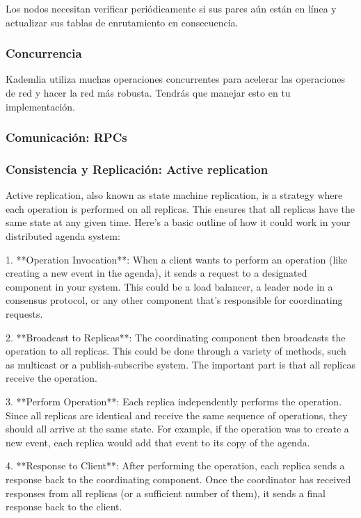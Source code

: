 \documentclass[10pt]{article} %
\begin{document}
	Los nodos necesitan verificar periódicamente si sus pares aún están en línea y actualizar sus tablas de enrutamiento en consecuencia.
	
	\subsubsection{Concurrencia} 
	
	Kademlia utiliza muchas operaciones concurrentes para acelerar las operaciones de red y hacer la red más robusta. Tendrás que manejar esto en tu implementación.
	
	\subsubsection{Comunicaci\'on: RPCs}
	
	\subsubsection{Consistencia y Replicaci\'on: Active replication}
	
	Active replication, also known as state machine replication, is a strategy where each operation is performed on all replicas. This ensures that all replicas have the same state at any given time. Here's a basic outline of how it could work in your distributed agenda system:
	
	1. **Operation Invocation**: When a client wants to perform an operation (like creating a new event in the agenda), it sends a request to a designated component in your system. This could be a load balancer, a leader node in a consensus protocol, or any other component that's responsible for coordinating requests.
	
	2. **Broadcast to Replicas**: The coordinating component then broadcasts the operation to all replicas. This could be done through a variety of methods, such as multicast or a publish-subscribe system. The important part is that all replicas receive the operation.
	
	3. **Perform Operation**: Each replica independently performs the operation. Since all replicas are identical and receive the same sequence of operations, they should all arrive at the same state. For example, if the operation was to create a new event, each replica would add that event to its copy of the agenda.
	
	4. **Response to Client**: After performing the operation, each replica sends a response back to the coordinating component. Once the coordinator has received responses from all replicas (or a sufficient number of them), it sends a final response back to the client.
	
\end{document}
